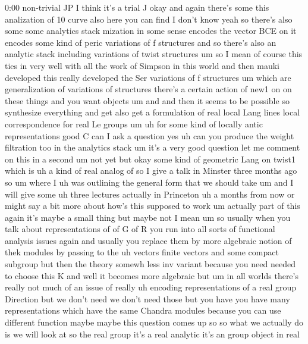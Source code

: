 \begin{unfinished}{0:00}
non-trivial  JP  I  think  it's  a  trial
J
okay  and  again  there's  some  this
analization  of  10  curve  also  here  you
can
find  I  don't
know  yeah  so  there's  also  some  some
analytics  stack
mization  in  some  sense
encodes  the  vector  BCE  on  it  encodes
some  kind  of  peric  variations  of  f
structures  and  so  there's  also  an
analytic  stack
including  variations  of  twist
structures
um  so  I  mean  of  course  this  ties  in  very
well  with  all  the  work  of  Simpson
in  this  world  and  then  mauki  developed
this  really  developed  the  Ser  variations
of  f
structures  um  which  are  generalization
of  variations  of
structures  there's  a  certain  action  of
new1  on  on  these  things  and  you  want
objects  um
and  and  then  it  seems  to  be  possible  so
synthesize  everything  and  get  also  get  a
formulation  of  real  local  Lang  lines
local  correspondence
for  real  Le
groups
um  uh  for  some  kind
of  locally  antic
representations
good  C  can  I  ask  a  question  yes  uh  can
you  produce  the  weight  filtration  too  in
the  analytics  stack  um  it's  a  very  good
question  let  me  comment  on  this  in  a
second  um  not
yet
but
okay  some  kind  of  geometric  Lang  on
twist1  which  is
uh  a  kind  of  real  analog
of  so  I  give  a  talk  in  Minster  three
months  ago  so  um  where  I  uh  was
outlining  the  general  form  that  we
should  take  um  and  I  will  give  some  uh
three  lectures  actually  in  Princeton  uh
a  months  from  now  or  might  say  a  bit
more  about  how's  this  supposed  to  work
um
actually  part  of  this  again  it's  maybe  a
small  thing  but  maybe  not  I  mean  um  so
usually  when  you  talk  about
representations  of  of  G  of
R  you  run  into  all  sorts  of  functional
analysis  issues  again  and  usually  you
replace  them  by  more  algebraic  notion  of
thek
modules  by  passing  to  the  uh  vectors
finite  vectors  and  some  compact  subgroup
but  then  the
theory  somewh  less  inv  variant  because
you  need  needed  to  choose  this  K  and
well  it  becomes  more  algebraic
but  um  in  all  worlds  there's  really  not
much  of  an  issue  of  really  uh
encoding  representations  of  a  real  group
Direction  but  we  don't  need  we  don't
need
those  but  you  have  you  have  many
representations  which  have  the  same
Chandra  modules  because  you  can  use
different  function
maybe
maybe  this  question  comes  up  so  so  what
we  actually  do  is  we  will  look  at  so  the
real  group  it's  a  real
analytic  it's  an  group  object  in  real

\end{unfinished}
